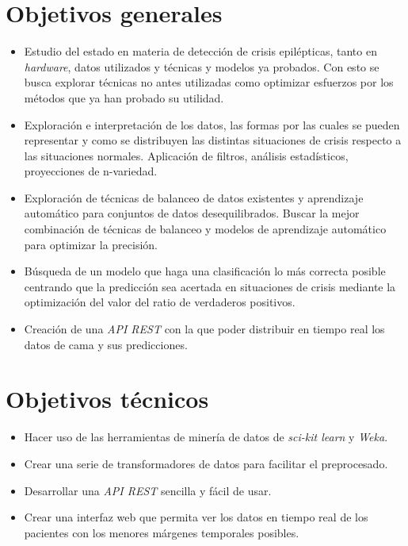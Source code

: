 
\section{Objetivos generales}

\begin{itemize}
	\item Estudio del estado en materia de detección de crisis epilépticas, tanto en \textit{hardware}, datos utilizados y técnicas y modelos ya probados. Con esto se busca explorar técnicas no antes utilizadas como optimizar esfuerzos por los métodos que ya han probado su utilidad.
	\item Exploración e interpretación de los datos, las formas por las cuales se pueden representar y como se distribuyen las distintas situaciones de crisis respecto a las situaciones normales. Aplicación de filtros, análisis estadísticos, proyecciones de n-variedad.
	\item Exploración de técnicas de balanceo de datos existentes y aprendizaje automático para conjuntos de datos desequilibrados. Buscar la mejor combinación de técnicas de balanceo y modelos de aprendizaje automático para optimizar la precisión.
	\item Búsqueda de un modelo que haga una clasificación lo más correcta posible centrando que la predicción sea acertada en situaciones de crisis mediante la optimización del valor del ratio de verdaderos positivos.
	\item Creación de una \textit{API REST} con la que poder distribuir en tiempo real los datos de cama y sus predicciones.
\end{itemize}

\section{Objetivos técnicos}

\begin{itemize}
	\item Hacer uso de las herramientas de minería de datos de \textit{sci-kit learn} y \textit{Weka}.
	\item Crear una serie de transformadores de datos para facilitar el preprocesado.
	\item Desarrollar una \textit{API REST} sencilla y fácil de usar.
	\item Crear una interfaz web que permita ver los datos en tiempo real de los pacientes con los menores márgenes temporales posibles.
\end{itemize}

